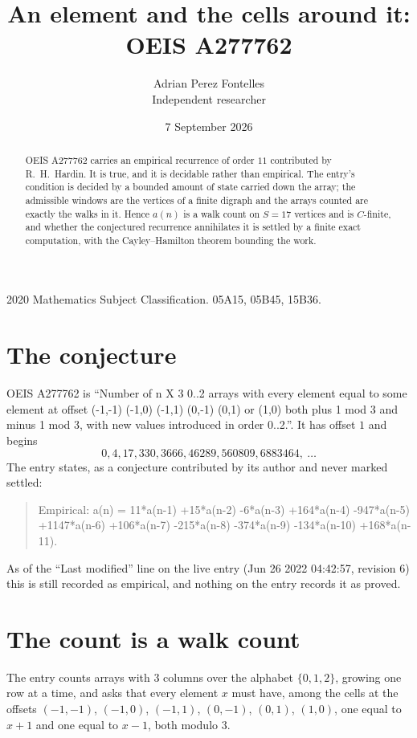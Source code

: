 \documentclass[11pt,a4paper]{article}
\title{An element and the cells around it: OEIS A277762}
\author{Adrian Perez Fontelles\\ \small Independent researcher}
\date{7 September 2026}
\theoremstyle{plain}
\theoremstyle{definition}
\begin{document}
\maketitle

\begin{abstract}
OEIS A277762 carries an empirical recurrence of order $11$ contributed by R.~H.~Hardin. It is
true, and it is decidable rather than empirical. The entry's condition is decided by a bounded amount of state carried down the array; the
admissible windows are the vertices of a finite digraph and the arrays counted are exactly the
walks in it. Hence $a(n)$ is a walk count on $S=17$ vertices and is $C$-finite, and whether the
conjectured recurrence annihilates it is settled by a finite exact computation, with the
Cayley--Hamilton theorem bounding the work.
\end{abstract}

\noindent\small 2020 Mathematics Subject Classification. 05A15, 05B45, 15B36.\normalsize

\section{The conjecture}

OEIS A277762 is ``Number of n X 3 0..2 arrays with every element equal to some element at offset (-1,-1) (-1,0) (-1,1) (0,-1) (0,1) or (1,0) both plus 1 mod 3 and minus 1 mod 3, with new values introduced in order 0..2.''. It has offset $1$ and begins
\[
0, 4, 17, 330, 3666, 46289, 560809, 6883464,\ \dots
\]
The entry states, as a conjecture contributed by its author and never marked settled:
\begin{quote}
Empirical: a(n) = 11*a(n-1) +15*a(n-2) -6*a(n-3) +164*a(n-4) -947*a(n-5) +1147*a(n-6) +106*a(n-7) -215*a(n-8) -374*a(n-9) -134*a(n-10) +168*a(n-11).
\end{quote}
As of the ``Last modified'' line on the live entry (Jun 26 2022 04:42:57, revision 6) this is still
recorded as empirical, and nothing on the entry records it as proved.

\section{The count is a walk count}

The entry counts arrays with $3$ columns over the alphabet $\{0,1,2\}$, growing one row at a time, and asks that every element $x$ must have, among the cells at the offsets $(-1,-1)$, $(-1,0)$, $(-1,1)$, $(0,-1)$, $(0,1)$, $(1,0)$, one equal to $x+1$ and one equal to $x-1$, both modulo $3$.
\end{document}
